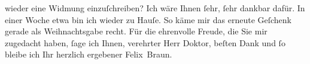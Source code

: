 \begin{ledgroupsized}[t]{13cm}
                    wieder eine Widmung einzuſchreiben? Ich wäre Ihnen ſehr, ſehr dankbar dafür. In
                    einer Woche etwa bin ich wieder zu Hauſe. {\pb}So
                    käme mir das erneute Geſchenk gerade als Weihnachtsgabe recht.\pend
           \pstart
           Für die ehrenvolle Freude, die Sie mir zugedacht haben, ſage ich Ihnen, verehrter
                    Herr Doktor, beſten Dank und ſo bleibe ich Ihr herzlich ergebener\pend
           \pstart \spacefill\mbox{Felix Braun.}\pend{}          \endnumbering{}\end{ledgroupsized}  \newcommand{\dateiname}{L02421}\newcommand{\titel}{Felix Braun an Arthur Schnitzler, 9. 12. 1924}\newcommand{\editorInnen}{Martin Anton Müller und Gerd-Hermann Susen}
      